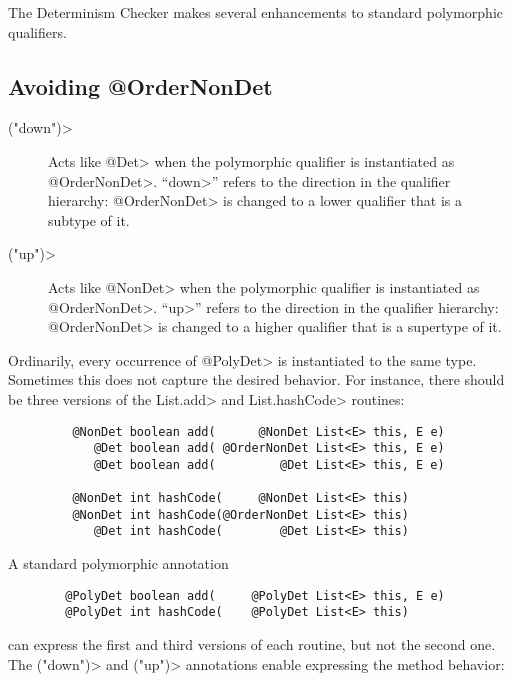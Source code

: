 The Determinism Checker makes
several enhancements to standard polymorphic qualifiers.


\subsection{Avoiding @OrderNonDet\label{determinism-polymorphism-ordernondet}}

\begin{description}
\item[\<("down")>]
  Acts like \<@Det> when the polymorphic qualifier is instantiated as
  \<@OrderNonDet>.
  ``\<down>'' refers to the direction in the qualifier hierarchy:
  \<@OrderNonDet> is changed to a lower qualifier that is a subtype of it.
\item[\<("up")>]
  Acts like \<@NonDet> when the polymorphic qualifier is instantiated as
  \<@OrderNonDet>.
  ``\<up>'' refers to the direction in the qualifier hierarchy:
  \<@OrderNonDet> is changed to a higher qualifier that is a supertype of it.
\end{description}

Ordinarily, every occurrence of \<@PolyDet> is instantiated to the same
type.  Sometimes this does not capture the desired behavior.  For instance,
there should be three versions of the \<List.add> and \<List.hashCode> routines:

\begin{Verbatim}
         @NonDet boolean add(      @NonDet List<E> this, E e)
            @Det boolean add( @OrderNonDet List<E> this, E e)
            @Det boolean add(         @Det List<E> this, E e)

         @NonDet int hashCode(     @NonDet List<E> this)
         @NonDet int hashCode(@OrderNonDet List<E> this)
            @Det int hashCode(        @Det List<E> this)
\end{Verbatim}

A standard polymorphic annotation

\begin{Verbatim}
        @PolyDet boolean add(     @PolyDet List<E> this, E e)
        @PolyDet int hashCode(    @PolyDet List<E> this)
\end{Verbatim}

\noindent
can express the first and third versions of each routine, but not the
second one.  The \<("down")> and
\<("up")> annotations enable
expressing the method behavior:

